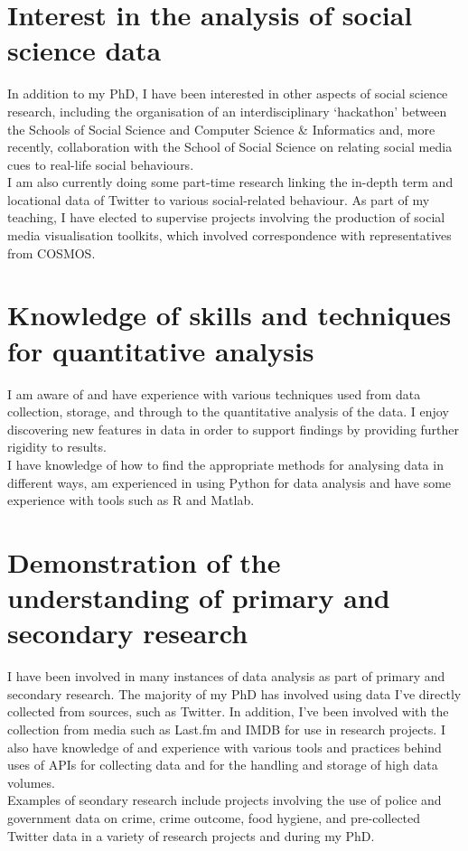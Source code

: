 \documentclass[10pt,a4paper]{article}
\begin{document}
\section*{Interest in the analysis of social science data}
In addition to my PhD, I have been interested in other aspects of social science research, including the organisation of an interdisciplinary `hackathon' between the Schools of Social Science and Computer Science \& Informatics and, more recently, collaboration with the School of Social Science on relating social media cues to real-life social behaviours.\\
I am also currently doing some part-time research linking the in-depth term and locational data of Twitter to various social-related behaviour. As part of my teaching, I have elected to supervise projects involving the production of social media visualisation toolkits, which involved correspondence with representatives from COSMOS.

\section*{Knowledge of skills and techniques for quantitative analysis}
I am aware of and have experience with various techniques used from data collection, storage, and through to the quantitative analysis of the data. I enjoy discovering new features in data in order to support findings by providing further rigidity to results.\\
I have knowledge of how to find the appropriate methods for analysing data in different ways, am experienced in using Python for data analysis and have some experience with tools such as R and Matlab.

\section*{Demonstration of the understanding of primary and secondary research}
I have been involved in many instances of data analysis as part of primary and secondary research. The majority of my PhD has involved using data I've directly collected from sources, such as Twitter. In addition, I've been involved with the collection from media such as Last.fm and IMDB for use in research projects. I also have knowledge of and experience with various tools and practices behind uses of APIs for collecting data and for the handling and storage of high data volumes.\\
Examples of seondary research include projects involving the use of police and government data on crime, crime outcome, food hygiene, and pre-collected Twitter data in a variety of research projects and during my PhD.
\end{document}
